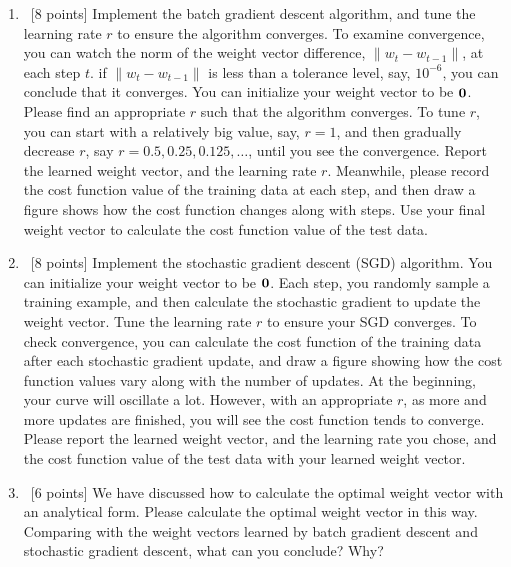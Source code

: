 \documentclass[12pt, fullpage,letterpaper]{article}
\begin{document}
\begin{enumerate}
	\begin{enumerate}
		\item~[8 points] Implement the batch gradient descent algorithm, and tune the learning rate $r$ to ensure the algorithm converges.  To examine convergence, you can watch the norm of the weight vector difference,  $\|w_{t} - w_{t-1}\|$,  at each step $t$.  if $\|w_{t} - w_{t-1}\|$ is  less than a tolerance level, say, $10^{-6}$, you can conclude that it converges. You can initialize your weight vector to be ${\bf 0}$.  Please find an appropriate $r$ such that the algorithm converges. To tune $r$, you can start with a relatively big value, say, $r=1$, and then gradually decrease $r$, say $r=0.5, 0.25, 0.125, \ldots$, until you see the convergence. 
		Report the learned weight vector, and the learning rate $r$. Meanwhile, please record the cost function  value of the training data at each step, and then draw a figure shows how the cost function changes along with steps. Use your final weight vector to calculate  the cost function value of the test data. 
		\item~[8 points] Implement the stochastic gradient descent (SGD) algorithm. You can initialize your weight vector to be ${\bf 0}$. Each step, you randomly sample a training example, and then calculate the stochastic gradient to update the weight vector.  Tune the learning rate $r$ to ensure your SGD converges. To check convergence, you can calculate the cost function of the training data after each stochastic gradient update, and draw a figure showing how the cost function values vary along with the number of updates. At the beginning, your curve will oscillate a lot. However, with an appropriate $r$, as more and more updates are finished, you will see the cost function tends to converge. Please report the learned weight vector, and the learning rate you chose, and the cost function value of the test data with your learned weight vector.   
		\item~[6 points] We have discussed how to  calculate the optimal weight vector with an analytical form. Please calculate the optimal weight vector in this way. Comparing with the  weight vectors learned by batch gradient descent and stochastic gradient descent, what can you conclude? Why?
	\end{enumerate}

\end{enumerate}
\end{document}
